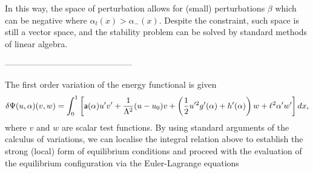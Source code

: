 % 
In this way, the space of perturbation allows for (small) perturbations $\beta$ which can be negative where $\alpha_t(x)>\alpha_-(x)$. Despite the constraint, such space is still a vector space, and the stability problem can be solved by standard methods of linear algebra.

---------------------------------------------

The first order variation of the energy functional  is given   
\begin{equation}
    \delta \Psi(u,\alpha)(v,w)=\int_0^1
\left[\mathsf{a}(\alpha)u'v'+\frac{1}{\Lambda^2} (u-u_0) v+ \left( \frac{1}{2}u'^2 g'(\alpha)+h'(\alpha) \right)  w+\ell^2\alpha'w' \right]dx,\label{firstvar1}
\end{equation}
where $v$ and $w$ are scalar test functions. 
By using standard arguments of the calculus of variations, we can localise the integral relation above to establish the strong (local) form of equilibrium conditions and proceed with the evaluation of the equilibrium configuration via the Euler-Lagrange equations


